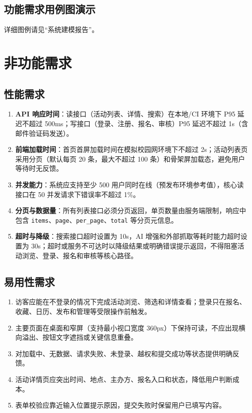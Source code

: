 \documentclass[12pt,a4paper]{ctexart}
\begin{document}
  \subsection{功能需求用例图演示}

  详细图例请见“系统建模报告”。

  

  \section{非功能需求}
  \subsection{性能需求}
  \begin{enumerate}
  \item \textbf{API 响应时间}：读接口（活动列表、详情、搜索）在本地/CI 环境下 P95 延迟不超过 500ms；写接口（登录、注册、报名、审核）P95 延迟不超过 1s（含邮件验证码发送）。
  \item \textbf{前端加载时间}：首页首屏加载时间在模拟校园网环境下不超过 2s；活动列表页采用分页（默认每页 20 条，最大不超过 100 条）和骨架屏加载态，避免用户等待时无反馈。
  \item \textbf{并发能力}：系统应支持至少 500 用户同时在线（预发布环境参考值），核心读接口在 50 并发请求下错误率不超过 1\%。
  \item \textbf{分页与数据量}：所有列表接口必须分页返回，单页数量由服务端限制，响应中包含 \texttt{items}、\texttt{page}、\texttt{per\_page}、\texttt{total} 等分页元信息。
  \item \textbf{超时与降级}：搜索接口超时设置为 10s，AI 增强和外部抓取等耗时能力超时设置为 30s；超时或服务不可达时以降级结果或明确错误提示返回，不得阻塞活动浏览、登录、报名和审核等核心路径。
  \end{enumerate}

  \subsection{易用性需求}
  \begin{enumerate}
  \item 访客应能在不登录的情况下完成活动浏览、筛选和详情查看；登录只在报名、收藏、日历、发布和管理等受限操作前触发。
  \item 主要页面在桌面和窄屏（支持最小视口宽度 360px）下保持可读，不应出现横向溢出、按钮文字遮挡或关键信息重叠。
  \item 对加载中、无数据、请求失败、未登录、越权和提交成功等状态提供明确反馈。
  \item 活动详情页应突出时间、地点、主办方、报名入口和状态，降低用户判断成本。
  \item 表单校验应靠近输入位置提示原因，提交失败时保留用户已填写内容。
  \end{enumerate}
\end{document}
